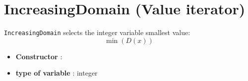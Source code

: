 \section{IncreasingDomain (Value iterator)}\label{increasingdomain:increasingdomainvaliterator}\hypertarget{increasingdomain:increasingdomainvaliterator}{}
\begin{notedef}
  \texttt{IncreasingDomain} selects the integer variable smallest value:
$$\min(D(x))$$
\end{notedef}

\begin{itemize}
	\item \textbf{Constructor} : 
	\item \textbf{type of variable} : integer
\end{itemize}

%

